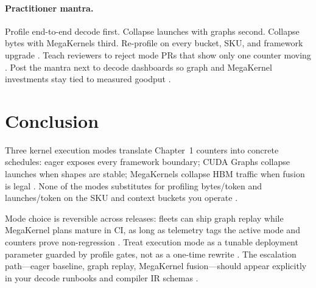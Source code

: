 \paragraph{Practitioner mantra.} Profile end-to-end decode first. Collapse launches with graphs second. Collapse bytes with MegaKernels third. Re-profile on every bucket, SKU, and framework upgrade \citep{taxbreak2026,memoryfloor2026,patel2025llminference,yirage2026,nvidia2024cudagraphs,chen2020compilerbasedhardw,amd2024xdna,semianalysis2024tma,dao2022flashattention,kwon2023vllm,liu2024deepseekv3,dlbook,dao2023flashdecoding,nvidia2022hopper,amd2024aie}. Teach reviewers to reject mode PRs that show only one counter moving \citep{patel2025llminference,taxbreak2026,memoryfloor2026,yirage2026,chen2020compilerbasedhardw,amd2024xdna,amd2024aie,semianalysis2024tma,nvidia2024cudagraphs,dao2022flashattention,kwon2023vllm,liu2024deepseekv3,dlbook,dao2023flashdecoding,nvidia2022hopper}. Post the mantra next to decode dashboards so graph and MegaKernel investments stay tied to measured goodput \citep{patel2025llminference,taxbreak2026,memoryfloor2026,yirage2026,nvidia2024cudagraphs,chen2020compilerbasedhardw,amd2024xdna,semianalysis2024tma,dao2022flashattention,kwon2023vllm,liu2024deepseekv3,dlbook,dao2023flashdecoding,nvidia2022hopper,amd2024aie}.

\section{Conclusion}
\label{sec:ch12_conclusion}

Three kernel execution modes translate Chapter~1 counters into concrete schedules: eager exposes every framework boundary; CUDA Graphs collapse launches when shapes are stable; MegaKernels collapse HBM traffic when fusion is legal \citep{taxbreak2026,nvidia2024cudagraphs,memoryfloor2026,yirage2026,dao2022flashattention}. None of the modes substitutes for profiling bytes/token and launches/token on the SKU and context buckets you operate \citep{patel2025llminference,semianalysis2024tma}.

Mode choice is reversible across releases: fleets can ship graph replay while MegaKernel plans mature in CI, as long as telemetry tags the active mode and counters prove non-regression \citep{nvidia2024cudagraphs,memoryfloor2026,taxbreak2026,yirage2026,patel2025llminference,chen2020compilerbasedhardw,amd2024xdna,amd2024aie,semianalysis2024tma,dao2022flashattention,kwon2023vllm,liu2024deepseekv3,dlbook,dao2023flashdecoding,nvidia2022hopper}. Treat execution mode as a tunable deployment parameter guarded by profile gates, not as a one-time rewrite \citep{patel2025llminference,taxbreak2026,memoryfloor2026,yirage2026,chen2020compilerbasedhardw,amd2024xdna,nvidia2024cudagraphs,semianalysis2024tma,dao2022flashattention,kwon2023vllm,liu2024deepseekv3,dlbook,dao2023flashdecoding,nvidia2022hopper,amd2024aie}. The escalation path---eager baseline, graph replay, MegaKernel fusion---should appear explicitly in your decode runbooks and compiler IR schemas \citep{yirage2026,chen2020compilerbasedhardw,patel2025llminference,taxbreak2026,memoryfloor2026,nvidia2024cudagraphs,amd2024xdna,semianalysis2024tma,dao2022flashattention,kwon2023vllm,liu2024deepseekv3,dlbook,dao2023flashdecoding,nvidia2022hopper,amd2024aie}.

